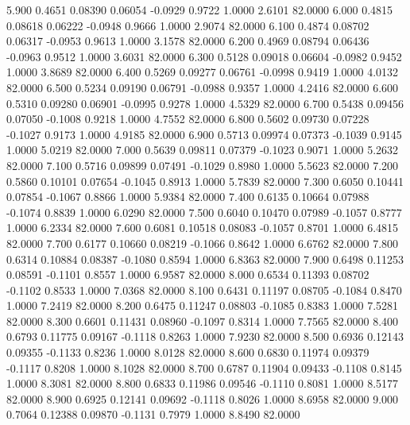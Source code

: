    5.900   0.4651   0.08390   0.06054  -0.0929   0.9722   1.0000   2.6101  82.0000
   6.000   0.4815   0.08618   0.06222  -0.0948   0.9666   1.0000   2.9074  82.0000
   6.100   0.4874   0.08702   0.06317  -0.0953   0.9613   1.0000   3.1578  82.0000
   6.200   0.4969   0.08794   0.06436  -0.0963   0.9512   1.0000   3.6031  82.0000
   6.300   0.5128   0.09018   0.06604  -0.0982   0.9452   1.0000   3.8689  82.0000
   6.400   0.5269   0.09277   0.06761  -0.0998   0.9419   1.0000   4.0132  82.0000
   6.500   0.5234   0.09190   0.06791  -0.0988   0.9357   1.0000   4.2416  82.0000
   6.600   0.5310   0.09280   0.06901  -0.0995   0.9278   1.0000   4.5329  82.0000
   6.700   0.5438   0.09456   0.07050  -0.1008   0.9218   1.0000   4.7552  82.0000
   6.800   0.5602   0.09730   0.07228  -0.1027   0.9173   1.0000   4.9185  82.0000
   6.900   0.5713   0.09974   0.07373  -0.1039   0.9145   1.0000   5.0219  82.0000
   7.000   0.5639   0.09811   0.07379  -0.1023   0.9071   1.0000   5.2632  82.0000
   7.100   0.5716   0.09899   0.07491  -0.1029   0.8980   1.0000   5.5623  82.0000
   7.200   0.5860   0.10101   0.07654  -0.1045   0.8913   1.0000   5.7839  82.0000
   7.300   0.6050   0.10441   0.07854  -0.1067   0.8866   1.0000   5.9384  82.0000
   7.400   0.6135   0.10664   0.07988  -0.1074   0.8839   1.0000   6.0290  82.0000
   7.500   0.6040   0.10470   0.07989  -0.1057   0.8777   1.0000   6.2334  82.0000
   7.600   0.6081   0.10518   0.08083  -0.1057   0.8701   1.0000   6.4815  82.0000
   7.700   0.6177   0.10660   0.08219  -0.1066   0.8642   1.0000   6.6762  82.0000
   7.800   0.6314   0.10884   0.08387  -0.1080   0.8594   1.0000   6.8363  82.0000
   7.900   0.6498   0.11253   0.08591  -0.1101   0.8557   1.0000   6.9587  82.0000
   8.000   0.6534   0.11393   0.08702  -0.1102   0.8533   1.0000   7.0368  82.0000
   8.100   0.6431   0.11197   0.08705  -0.1084   0.8470   1.0000   7.2419  82.0000
   8.200   0.6475   0.11247   0.08803  -0.1085   0.8383   1.0000   7.5281  82.0000
   8.300   0.6601   0.11431   0.08960  -0.1097   0.8314   1.0000   7.7565  82.0000
   8.400   0.6793   0.11775   0.09167  -0.1118   0.8263   1.0000   7.9230  82.0000
   8.500   0.6936   0.12143   0.09355  -0.1133   0.8236   1.0000   8.0128  82.0000
   8.600   0.6830   0.11974   0.09379  -0.1117   0.8208   1.0000   8.1028  82.0000
   8.700   0.6787   0.11904   0.09433  -0.1108   0.8145   1.0000   8.3081  82.0000
   8.800   0.6833   0.11986   0.09546  -0.1110   0.8081   1.0000   8.5177  82.0000
   8.900   0.6925   0.12141   0.09692  -0.1118   0.8026   1.0000   8.6958  82.0000
   9.000   0.7064   0.12388   0.09870  -0.1131   0.7979   1.0000   8.8490  82.0000

